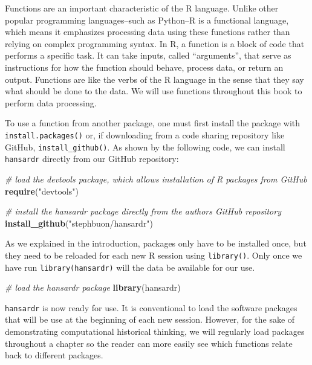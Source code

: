 \documentclass[
]{article}
\newenvironment{Shaded}{\begin{snugshade}}{\end{snugshade}}
\newcommand{\CommentTok}[1]{\textcolor[rgb]{0.56,0.35,0.01}{\textit{#1}}}
\newcommand{\FunctionTok}[1]{\textcolor[rgb]{0.13,0.29,0.53}{\textbf{#1}}}
\newcommand{\NormalTok}[1]{#1}
\newcommand{\StringTok}[1]{\textcolor[rgb]{0.31,0.60,0.02}{#1}}
\begin{document}
Functions are an important characteristic of the R language. Unlike
other popular programming languages--such as Python--R is a functional
language, which means it emphasizes processing data using these
functions rather than relying on complex programming syntax. In R, a
function is a block of code that performs a specific task. It can take
inputs, called ``arguments'', that serve as instructions for how the
function should behave, process data, or return an output. Functions are
like the verbs of the R language in the sense that they say what should
be done to the data. We will use functions throughout this book to
perform data processing.

To use a function from another package, one must first install the
package with \texttt{install.packages()} or, if downloading from a code
sharing repository like GitHub, \texttt{install\_github()}. As shown by
the following code, we can install \texttt{hansardr} directly from our
GitHub repository:

\begin{Shaded}
\begin{Highlighting}[]
\CommentTok{\# load the \textquotesingle{}devtools\textquotesingle{} package, which allows installation of R packages from GitHub}
\FunctionTok{require}\NormalTok{(}\StringTok{"devtools"}\NormalTok{)}

\CommentTok{\# install the \textquotesingle{}hansardr\textquotesingle{} package directly from the author\textquotesingle{}s GitHub repository}
\FunctionTok{install\_github}\NormalTok{(}\StringTok{"stephbuon/hansardr"}\NormalTok{)}
\end{Highlighting}
\end{Shaded}

As we explained in the introduction, packages only have to be installed
once, but they need to be reloaded for each new R session using
\texttt{library()}. Only once we have run \texttt{library(hansardr)}
will the data be available for our use.

\begin{Shaded}
\begin{Highlighting}[]
\CommentTok{\# load the hansardr package}
\FunctionTok{library}\NormalTok{(hansardr)}
\end{Highlighting}
\end{Shaded}

\texttt{hansardr} is now ready for use. It is conventional to load the
software packages that will be use at the beginning of each new session.
However, for the sake of demonstrating computational historical
thinking, we will regularly load packages throughout a chapter so the
reader can more easily see which functions relate back to different
packages.
\end{document}
